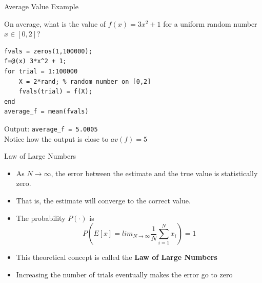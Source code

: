 \documentclass[10pt]{beamer}
\begin{document}
\begin{frame}[fragile]{Average Value Example}
\begin{example}
    On average, what is the value of $f(x)=3x^2+1$ for a uniform random number  $x\in[0,2]$?
\end{example}

\begin{lstlisting}[mathescape]
fvals = zeros(1,100000);
f=@(x) 3*x^2 + 1;
for trial = 1:100000
    X = 2*rand; % random number on [0,2]
    fvals(trial) = f(X);
end
average_f = mean(fvals)
\end{lstlisting}
Output: \texttt{average\_f = 5.0005}\\
\vspace{3mm}
Notice how the output is close to $av(f) = 5$
\end{frame}


\begin{frame}{Law of Large Numbers}



\begin{itemize}
    \item As $N \rightarrow \infty$, the error between the estimate and the true value is statistically zero.  
    \item That is, the estimate will converge to the correct value.  
    \item The probability $P(\cdot)$ is
        \begin{equation*} 
          P\left(E[x] = lim_{N\rightarrow\infty} \frac{1}{N} \sum_{i=1}^{N} x_i\right) = 1
        \end{equation*}
    \item This theoretical concept is called the \textbf{Law of Large Numbers}
    \item Increasing the number of trials eventually makes the error go to zero
\end{itemize}
\end{frame}
\end{document}

